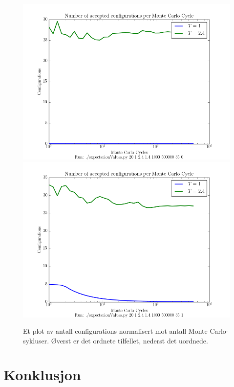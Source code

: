 \documentclass[11pt]{article}
\begin{document}
\begin{figure}[ht]
  \centering
  \includegraphics[scale=0.7]{../fig/configurations.png}
  \includegraphics[scale=0.7]{../fig/configurations_random.png}

  \caption{\label{fig:configurations} Et plot av antall configurations
normalisert mot antall Monte Carlo-sykluser. Øverst er det ordnete tilfellet, nederst det uordnede.}
\end{figure}





\section{Konklusjon}

\clearpage
\printbibliography
\end{document}
